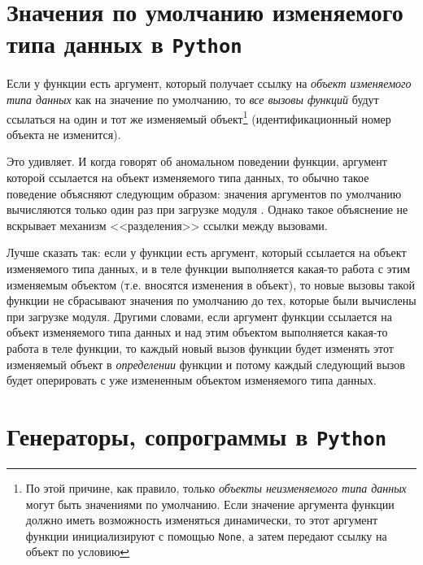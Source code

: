 \documentclass[%
	11pt,
	a4paper,
	utf8,
		]{article}
\begin{document}

\section{Значения по умолчанию изменяемого типа данных в \texttt{Python}}

Если у функции есть аргумент, который получает ссылку на \emph{объект изменяемого типа данных} как на значение по умолчанию, то \emph{все вызовы функций} будут ссылаться на один и тот же изменяемый объект\footnote{По этой причине, как правило, только \emph{объекты неизменяемого типа данных} могут быть значениями по умолчанию. Если значение аргумента функции должно иметь возможность изменяться динамически, то этот аргумент функции инициализируют с помощью \texttt{None}, а затем передают ссылку на объект по условию} (идентификационный номер объекта не изменится).

Это удивляет. И когда говорят об аномальном поведении функции, аргумент которой ссылается на объект изменяемого типа данных, то обычно такое поведение объясняют следующим образом: значения аргументов по умолчанию вычисляются только один раз при загрузке модуля \cite[]{slatkin:python-2016}. Однако такое объяснение не вскрывает механизм <<разделения>> ссылки между вызовами.

Лучше сказать так: если у функции есть аргумент, который ссылается на объект изменяемого типа данных, и в теле функции выполняется какая-то работа с этим изменяемым объектом (т.е. вносятся изменения в объект), то новые вызовы такой функции не сбрасывают значения по умолчанию до тех, которые были вычислены при загрузке модуля. Другими словами, если аргумент функции ссылается на объект изменяемого типа данных и над этим объектом выполняется какая-то работа в теле функции, то каждый новый вызов функции будет изменять этот изменяемый объект в \emph{определении} функции и потому каждый следующий вызов будет оперировать с уже измененным объектом изменяемого типа данных.


\section{Генераторы, сопрограммы в \texttt{Python}}
\end{document}
